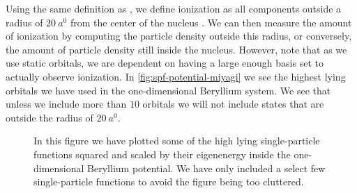         Using the same definition as \citeauthor{takeshi} \cite{takeshi}, we
        define ionization as all components outside a radius of $\SI{20}{\bohr}$
        from the center of the nucleus \cite{hochstuhl2014time, takeshi}.
        We can then measure the amount of ionization by computing the particle
        density outside this radius, or conversely, the amount of particle
        density still inside the nucleus.
        However, note that as we use static orbitals, we are dependent on having
        a large enough basis set to actually observe ionization.
        In \autoref{fig:spf-potential-miyagi} we see the highest lying
        orbitals we have used in the one-dimensional Beryllium system.
        We see that unless we include more than $10$ orbitals we will not
        include states that are outside the radius of $\SI{20}{\bohr}$.
        \begin{figure}
            \centering
            \caption{In this figure we have plotted some of the high lying
            single-particle functions squared and scaled by their
            eigenenergy inside the one-dimensional Beryllium potential.
            We have only included a select few single-particle functions to
            avoid the figure being too cluttered.}
            \label{fig:spf-potential-miyagi}
        \end{figure}
